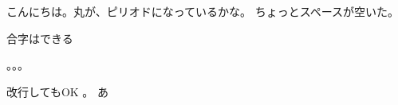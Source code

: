 \documentclass[dvipdfmx,uplatex,a4j]{jsarticle}
\begin{document}
こんにちは。丸が、ピリオドになっているかな。
ちょっとスペースが空いた。

合字はできる

。。。

改行してもOK
。
あ
\end{document}
